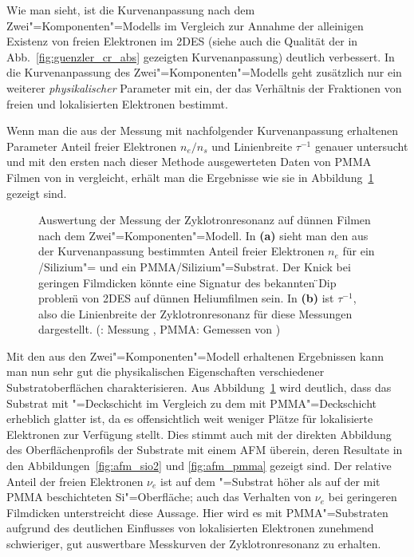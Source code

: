 Wie man sieht, ist die Kurvenanpassung nach dem Zwei"=Komponenten"=Modells im Vergleich zur Annahme der alleinigen Existenz von freien Elektronen im 2DES (siehe auch die Qualität der in Abb.~\ref{fig:guenzler_cr_abs} gezeigten Kurvenanpassung) deutlich verbessert. In die Kurvenanpassung des Zwei"=Komponenten"=Modells geht zusätzlich nur ein weiterer \emph{physikalischer} Parameter mit ein, der das Verhältnis der Fraktionen von freien und lokalisierten Elektronen bestimmt.

Wenn man die aus der Messung mit nachfolgender Kurvenanpassung erhaltenen Parameter Anteil freier Elektronen $n_e/n_s$ und Linienbreite $\tau^{-1}$ genauer untersucht und mit den ersten nach dieser Methode ausgewerteten Daten von PMMA Filmen von  in \cite{Kli02} vergleicht, erhält man die Ergebnisse wie sie in Abbildung~\ref{fig:filmcr_res1} gezeigt sind.

\begin{figure}[h!tbp]
	\begin{center}
	\end{center}
	\caption[Kurvenanpassung nach dem Zwei"=Komponenten"=Modell]{Auswertung der Messung der Zyklotronresonanz auf dünnen Filmen nach dem Zwei"=Komponenten"=Modell. In {\bfseries (a)} sieht man den aus der Kurvenanpassung bestimmten Anteil freier Elektronen $n_e$ für ein \SiO /Silizium"= und ein PMMA/Silizium"=Substrat. Der Knick bei geringen Filmdicken könnte eine Signatur des bekannten \"{}Dip problem\"{} \cite{Shi01} von 2DES auf dünnen Heliumfilmen sein. In {\bfseries (b)} ist $\tau^{-1}$, also die Linienbreite der Zyklotronresonanz für diese Messungen dargestellt. (\SiO: Messung , PMMA: Gemessen von )}
	\label{fig:filmcr_res1}
\end{figure}

Mit den aus den Zwei"=Komponenten"=Modell erhaltenen Ergebnissen kann man nun sehr gut die physikalischen Eigenschaften verschiedener Substratoberflächen charakterisieren. Aus Abbildung~\ref{fig:filmcr_res1} wird deutlich, dass das Substrat mit \SiO"=Deckschicht im Vergleich zu dem mit PMMA"=Deckschicht erheblich glatter ist, da es offensichtlich weit weniger Plätze für lokalisierte Elektronen zur Verfügung stellt. Dies stimmt auch mit der direkten Abbildung des Oberflächenprofils der Substrate mit einem AFM überein, deren Resultate in den Abbildungen~\ref{fig:afm_sio2} und \ref{fig:afm_pmma} gezeigt sind. Der relative Anteil der freien Elektronen $\nu_e$ ist auf dem \SiO"=Substrat höher als auf der mit PMMA beschichteten Si"=Oberfläche; auch das Verhalten von $\nu_e$ bei geringeren Filmdicken unterstreicht diese Aussage. Hier wird es mit PMMA"=Substraten aufgrund des deutlichen Einflusses von lokalisierten Elektronen zunehmend schwieriger, gut auswertbare Messkurven der Zyklotronresonanz zu erhalten.

